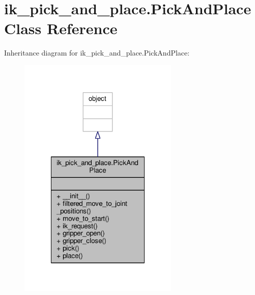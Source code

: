 \hypertarget{classik__pick__and__place_1_1_pick_and_place}{\section{ik\-\_\-pick\-\_\-and\-\_\-place.\-Pick\-And\-Place Class Reference}
\label{classik__pick__and__place_1_1_pick_and_place}
}


Inheritance diagram for ik\-\_\-pick\-\_\-and\-\_\-place.\-Pick\-And\-Place\-:
\nopagebreak
\begin{figure}[H]
\begin{center}
\leavevmode
\includegraphics[width=216pt]{classik__pick__and__place_1_1_pick_and_place__inherit__graph}
\end{center}
\end{figure}


